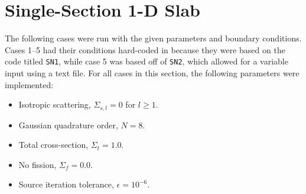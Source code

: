 \documentclass{NE515}
\theoremstyle{definition}
\begin{document}
    \section{Single-Section 1-D Slab}
    The following cases were run with the given parameters and boundary conditions.
    Cases 1--5 had their conditions hard-coded in because they were based on the code titled \texttt{SN1}, while case 5 was based off of \texttt{SN2}, which allowed for a variable input using a text file.
    For all cases in this section, the following parameters were implemented:
    \begin{itemize}
        \item Isotropic scattering, $\Sigma_{s,l}=0$ for $l\geq 1$.
        \item Gaussian quadrature order, $N=8$.
        \item Total cross-section, $\Sigma_t=1.0$.
        \item No fission, $\Sigma_f=0.0$.
        \item Source iteration tolerance, $\epsilon=10^{-6}$.
    \end{itemize}
    \clearpage
\end{document}
